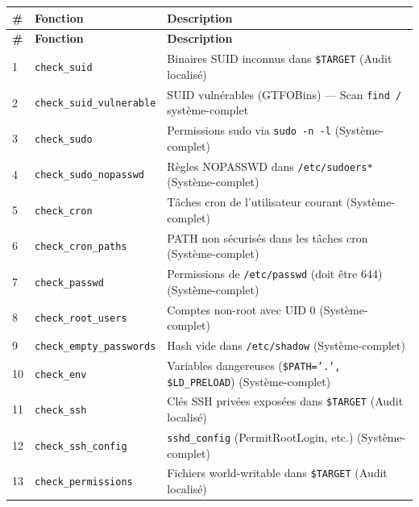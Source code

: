 \documentclass[12pt,a4paper]{article}
\newcommand{\cmd}[1]{\texttt{\textcolor{codeText}{#1}}}
\newcommand{\fichier}[1]{\texttt{\textcolor{bleuENSET}{#1}}}
\begin{document}
\vspace{6pt}
\begin{longtable}{C{0.7cm} L{3.8cm} L{9.3cm}}
  \textbf{\color{white}\#} & \textbf{\color{white}Fonction} & \textbf{\color{white}Description} \\
  \endfirsthead
  \textbf{\color{white}\#} & \textbf{\color{white}Fonction} & \textbf{\color{white}Description} \\
  \endhead
  1  & \cmd{check\_suid}              & Binaires SUID inconnus dans \cmd{\$TARGET} (Audit localisé) \\
  2  & \cmd{check\_suid\_vulnerable}  & SUID vulnérables (GTFOBins) --- Scan \cmd{find /} système-complet \\
  3  & \cmd{check\_sudo}              & Permissions sudo via \cmd{sudo -n -l} (Système-complet) \\
  4  & \cmd{check\_sudo\_nopasswd}    & Règles NOPASSWD dans \fichier{/etc/sudoers*} (Système-complet) \\
  5  & \cmd{check\_cron}              & Tâches cron de l'utilisateur courant (Système-complet) \\
  6  & \cmd{check\_cron\_paths}       & PATH non sécurisés dans les tâches cron (Système-complet) \\
  7  & \cmd{check\_passwd}            & Permissions de \fichier{/etc/passwd} (doit être 644) (Système-complet) \\
  8  & \cmd{check\_root\_users}       & Comptes non-root avec UID 0 (Système-complet) \\
  9  & \cmd{check\_empty\_passwords}  & Hash vide dans \fichier{/etc/shadow} (Système-complet) \\
  10 & \cmd{check\_env}               & Variables dangereuses (\cmd{\$PATH='.', \$LD\_PRELOAD}) (Système-complet) \\
  11 & \cmd{check\_ssh}               & Clés SSH privées exposées dans \cmd{\$TARGET} (Audit localisé) \\
  12 & \cmd{check\_ssh\_config}       & \fichier{sshd\_config} (PermitRootLogin, etc.) (Système-complet) \\
  13 & \cmd{check\_permissions}       & Fichiers world-writable dans \cmd{\$TARGET} (Audit localisé) \\

\end{longtable}
\end{document}

